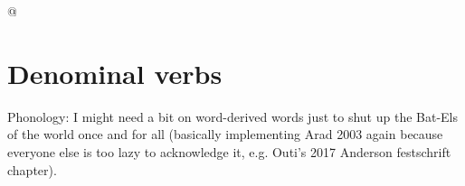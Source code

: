 @\cite{ahdoutkastner18}



%
%
%  
%
%
%

\section{Denominal verbs} \label{passn:denom}
	Phonology: I might need a bit on word-derived words just to shut up the Bat-Els of the world once and for all (basically implementing Arad 2003 again because everyone else is too lazy to acknowledge it, e.g. Outi's 2017 Anderson festschrift chapter).

